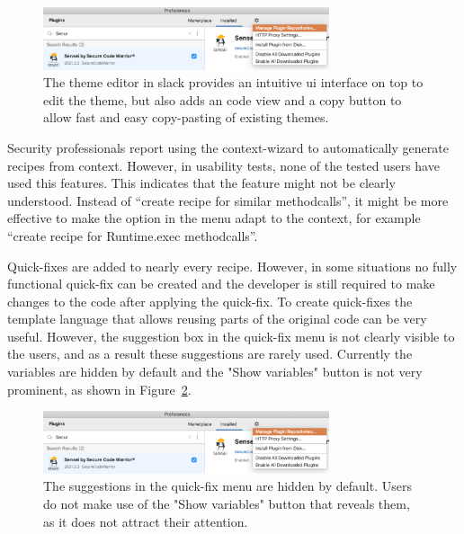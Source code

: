 \begin{figure}
  \centering
  \includegraphics[width=0.75\textwidth,page=16]{04-tools/figures/figures2.pdf}
  
  \caption[Slack theme editor]{The theme editor in slack provides an intuitive \gls{ui} interface on top to edit the theme, but also adds an code view and a copy button to allow fast and easy copy-pasting of existing themes.}
  \label{fig:slacktheme} 
\end{figure}

Security professionals report using the context-wizard to automatically generate recipes from context.
However, in usability tests, none of the tested users have used this features.
This indicates that the feature might not be clearly understood.
Instead of “create recipe for similar methodcalls”, it might be more effective to make the option in the menu adapt to the context, for example “create recipe for Runtime.exec methodcalls”.

Quick-fixes are added to nearly every recipe.
However, in some situations no fully functional quick-fix can be created and the developer is still required to make changes to the code after applying the quick-fix.
To create quick-fixes the template language that allows reusing parts of the original code can be very useful.
However, the suggestion box in the quick-fix menu is not clearly visible to the users, and as a result these suggestions are rarely used.
Currently the variables are hidden by default and the "Show variables" button is not very prominent, as shown in Figure~\ref{fig:showvariables}.

\begin{figure}
  \centering
  \includegraphics[width=0.75\textwidth,page=15]{04-tools/figures/figures2.pdf}
  \caption[Show variables button in the fix menu]{The suggestions in the quick-fix menu are hidden by default. Users do not make use of the "Show variables" button that reveals them, as it does not attract their attention.}
  \label{fig:showvariables} 
\end{figure}

